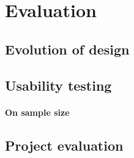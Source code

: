 \chapter{Evaluation}\label{chap:evaluation}

\section{Evolution of design}\label{sec:evolution-of-design}


\section{Usability testing}\label{sec:usability-testing}

\cite{rubin2008handbook, dumas1999practical}

\subsubsection*{On sample size}
\cite{faulkner2003beyond}

\section{Project evaluation}\label{sec:project-evaluation}

